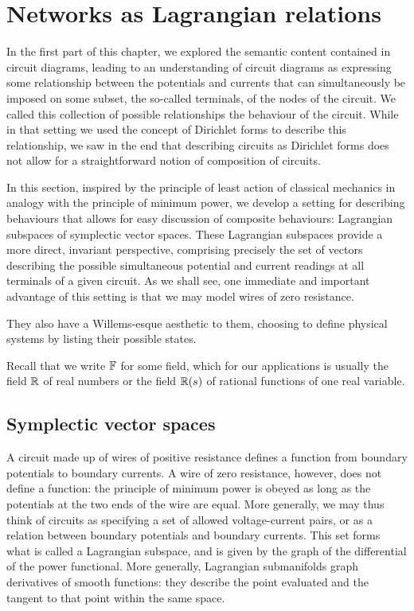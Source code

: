 \section{Networks as Lagrangian relations} \label{sec:circlagr}
In the first part of this chapter, we explored the semantic content contained in
circuit diagrams, leading to an understanding of circuit diagrams as expressing
some relationship between the potentials and currents that can simultaneously be
imposed on some subset, the so-called terminals, of the nodes of the circuit. We
called this collection of possible relationships the behaviour of the circuit.
While in that setting we used the concept of Dirichlet forms to describe this
relationship, we saw in the end that describing circuits as Dirichlet forms does
not allow for a straightforward notion of composition of circuits. 

In this section, inspired by the principle of least action of classical
mechanics in analogy with the principle of minimum power, we develop a setting
for describing behaviours that allows for easy discussion of composite
behaviours: Lagrangian subspaces of symplectic vector spaces. These Lagrangian
subspaces provide a more direct, invariant perspective, comprising precisely the
set of vectors describing the possible simultaneous potential and current
readings at all terminals of a given circuit. As we shall see, one immediate and
important advantage of this setting is that we may model wires of zero
resistance.

They also have a Willems-esque aesthetic to them, choosing to define physical
systems by listing their possible states.

Recall that we write ${\mathbb F}$ for some field, which for our applications is
usually the field ${\mathbb{R}}$ of real numbers or the field ${\mathbb{R}}(s)$ of rational
functions of one real variable.

\subsection{Symplectic vector spaces}

A circuit made up of wires of positive resistance defines a function from
boundary potentials to boundary currents. A wire of zero resistance, however,
does not define a function: the principle of minimum power is obeyed as long as
the potentials at the two ends of the wire are equal. More generally, we may
thus think of circuits as specifying a set of allowed voltage-current pairs, or
as a relation between boundary potentials and boundary currents. This set forms
what is called a Lagrangian subspace, and is given by the graph of the
differential of the power functional. More generally, Lagrangian submanifolds
graph derivatives of smooth functions: they describe the point evaluated and the
tangent to that point within the same space.

